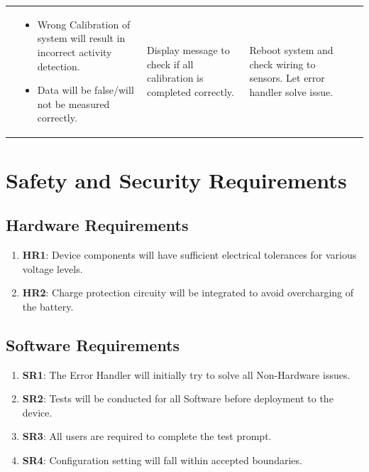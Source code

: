 \documentclass{article}
\begin{document}
\begin{table}[H]
\begin{tabular}{|p{3em}|p{5em}|p{7em}|p{8em}|p{6em}|p{7em}|}
		 & \begin{itemize}[nosep, wide=0pt, leftmargin=*, after=\strut]
			   \item Wrong Calibration of system will result in incorrect activity detection.
			   \item Data will be false/will not be measured correctly.
		   \end{itemize}

		 & Display message to check if all calibration is completed correctly.
		 & Reboot system and check wiring to sensors. Let error handler solve issue. \tabularnewline\cline{1-6}

	\end{tabular}%

	\end{table}

\pagebreak

\section{Safety and Security Requirements}

\subsection{Hardware Requirements}
\begin{enumerate}
	\item\label{HR1}\textbf{HR1}: Device components will have sufficient electrical tolerances for various voltage levels.\\
	\item\label{HR2}\textbf{HR2}: Charge protection circuity will be integrated to avoid overcharging of the battery.\\

\end{enumerate}

\subsection{Software  Requirements}
\begin{enumerate}
	\item\label{SR1}\textbf{SR1}: The Error Handler will initially try to solve all Non-Hardware issues.\\
	\item\label{SR2}\textbf{SR2}: Tests will be conducted for all Software before deployment to the device.\\
	\item\label{SR3}\textbf{SR3}: All users are required to complete the test prompt.\\
	\item\label{SR4}\textbf{SR4}: Configuration setting will fall within accepted boundaries.\\
\end{enumerate}
\end{document}
